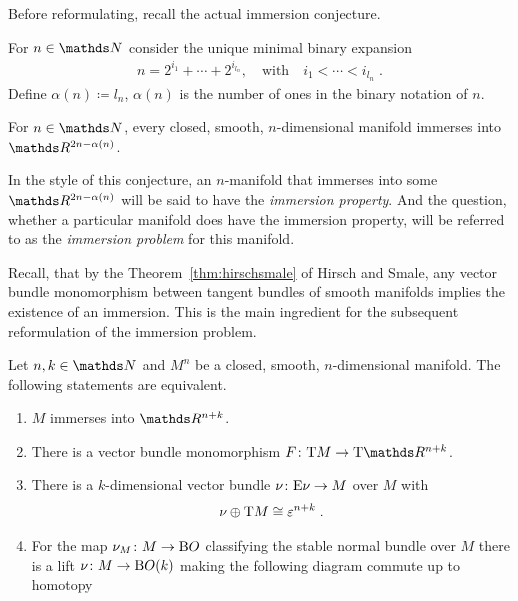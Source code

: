 Before reformulating, recall the actual immersion conjecture.
\begin{Def}
  For $n\in\Nat$ consider the unique minimal binary expansion
  \begin{gather*}
    n=2^{i_1}+\dotsb+2^{i_{l_n}},
    \quad\text{with}\quad
    i_1<\dotsb<i_{l_n}
    \;.
  \end{gather*}
  Define $\alpha(n)\coloneqq l_n$, \idest $\alpha(n)$ is the number of
  ones in the binary notation of $n$.
\end{Def}
\begin{Thm}\label{thm:immersionconj}
  For $n\in\Nat$, every closed, smooth, $n$-dimensional manifold
  immerses into $\R^{2n-\alpha(n)}$.
\end{Thm}
In the style of this conjecture, an $n$-manifold that immerses into
some $\R^{2n-\alpha(n)}$ will be said to have the
\emph{immersion property}.
And the question, whether a particular manifold does have the
immersion property, will be referred to as the \emph{immersion problem} for
this manifold.

Recall, that by the Theorem~\ref{thm:hirschsmale} of Hirsch and Smale,
any vector bundle monomorphism between tangent bundles of smooth
manifolds implies the existence of an immersion.
This is the main ingredient for the subsequent reformulation of the
immersion problem.
\begin{Thm}\label{thm:immersionconj:equivalences}
  Let $n,k\in\Nat$ and $M^n$ be a closed, smooth, $n$-dimensional manifold.
  The following statements are equivalent.
  \begin{enumerate}
  \item\label{item:immersionconj:1}
    $M$ immerses into $\R^{n+k}$.
  \item\label{item:immersionconj:2}
    There is a vector bundle monomorphism $F\colon\T M\to\T{\R^{n+k}}$.
  \item\label{item:immersionconj:3}
    There is a $k$-dimensional vector bundle
    $\nu_{}\colon\mathrm{E}\nu_{}\to M$ over $M$ with
    \begin{gather*}
      \nu_{}\oplus\mathrm{T}M\cong\varepsilon^{n+k}
      \;.
    \end{gather*}
  \item\label{item:immersionconj:4}
    For the map $\nu_{M}\colon M\to\mathrm{B}O$ classifying the stable
    normal bundle over $M$ there is a lift $\nu_{}\colon M\to\mathrm{B}O(k)$
    making the following diagram commute up to homotopy
    \begin{center}
    \end{center}
  \end{enumerate}
\end{Thm}

